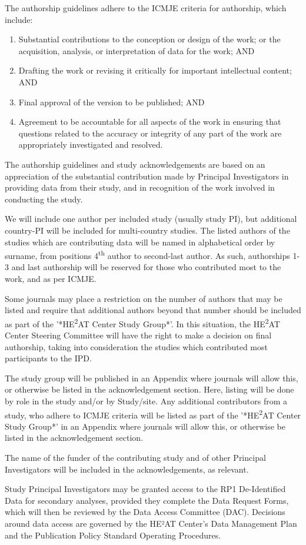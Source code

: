 \documentclass[12pt,letterpaper]{article}
\begin{document}
The authorship guidelines adhere to the ICMJE criteria for authorship, which include:
\begin{enumerate}
    \item Substantial contributions to the conception or design of the work; or the acquisition, analysis, or interpretation of data for the work; AND
    \item Drafting the work or revising it critically for important intellectual content; AND
    \item Final approval of the version to be published; AND
    \item Agreement to be accountable for all aspects of the work in ensuring that questions related to the accuracy or integrity of any part of the work are appropriately investigated and resolved.
\end{enumerate}

The authorship guidelines and study acknowledgements are based on an appreciation of the substantial contribution made by Principal Investigators in providing data from their study, and in recognition of the work involved in conducting the study.

We will include one author per included study (usually study PI), but additional country-PI will be included for multi-country studies. The listed authors of the studies which are contributing data will be named in alphabetical order by surname, from positions 4\textsuperscript{th} author to second-last author. As such, authorships 1-3 and last authorship will be reserved for those who contributed most to the work, and as per ICMJE.

Some journals may place a restriction on the number of authors that may be listed and require that additional authors beyond that number should be included as part of the '*HE\textsuperscript{2}AT Center Study Group*'. In this situation, the HE\textsuperscript{2}AT Center Steering Committee will have the right to make a decision on final authorship, taking into consideration the studies which contributed most participants to the IPD.

The study group will be published in an Appendix where journals will allow this, or otherwise be listed in the acknowledgement section. Here, listing will be done by role in the study and/or by Study/site. Any additional contributors from a study, who adhere to ICMJE criteria will be listed as part of the '*HE\textsuperscript{2}AT Center Study Group*' in an Appendix where journals will allow this, or otherwise be listed in the acknowledgement section.

The name of the funder of the contributing study and of other Principal Investigators will be included in the acknowledgements, as relevant.

Study Principal Investigators may be granted access to the RP1 De-Identified Data for secondary analyses, provided they complete the Data Request Forms, which will then be reviewed by the Data Access Committee (DAC). Decisions around data access are governed by the HE²AT Center's Data Management Plan and the Publication Policy Standard Operating Procedures.
\end{document}
